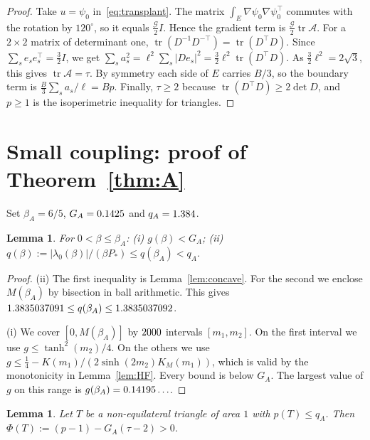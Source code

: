 \documentclass[11pt]{article}
\newtheorem{lemma}[theorem]{Lemma}
\theoremstyle{remark}
\newcommand{\E}{E}
\DeclareMathOperator{\tr}{tr}
\begin{document}
\begin{proof}
Take $u=\psi_0$ in~\eqref{eq:transplant}. The matrix $\int_\E\nabla\psi_0\nabla\psi_0^{\top}$ commutes with the
rotation by $120^\circ$, so it equals $\frac{\mathcal G}2I$. Hence the gradient term is
$\frac{\mathcal G}2\tr\mathcal A$. For a $2\times2$ matrix of determinant one,
$\tr(D^{-1}D^{-\top})=\tr(D^\top D)$. Since $\sum_se_se_s^\top=\frac32I$, we get
$\sum_s a_s^2=\ell^2\sum_s|De_s|^2=\frac32\ell^2\tr(D^\top D)$. As $\frac32\ell^2=2\sqrt3$, this gives
$\tr\mathcal A=\tau$. By symmetry each side of $\E$ carries $B/3$, so the boundary term is
$\frac B3\sum_s a_s/\ell=Bp$. Finally, $\tau\ge2$ because $\tr(D^\top D)\ge2\det D$, and $p\ge1$ is the
isoperimetric inequality for triangles.
\end{proof}

\section{Small coupling: proof of Theorem~\ref{thm:A}}\label{sec:A}

Set $\beta_A=6/5$, $G_A=0.1425$ and $q_A=1.384$.

\begin{lemma}\label{lem:gq}
For $0<\beta\le\beta_A$: (i) $g(\beta)<G_A$; (ii)
$q(\beta):=|\lambda_0(\beta)|/(\beta P_*)\le q(\beta_A)<q_A$.
\end{lemma}

\begin{proof}
(ii) The first inequality is Lemma~\ref{lem:concave}. For the second we enclose $M(\beta_A)$ by
bisection in ball arithmetic. This gives $1.3835037091\le q(\beta_A)\le1.3835037092$.

(i) We cover $[0,M(\beta_A)]$ by $2000$ intervals $[m_1,m_2]$. On the first interval we use
$g\le\tanh^2(m_2)/4$. On the others we use $g\le\frac14-K(m_1)/(2\sinh(2m_2)K_M(m_1))$, which is valid by
the monotonicity in Lemma~\ref{lem:HF}. Every bound is below $G_A$. The largest value of $g$ on this
range is $g(\beta_A)=0.14195\ldots$.
\end{proof}

\begin{lemma}\label{lem:geomA}
Let $T$ be a non-equilateral triangle of area $1$ with $p(T)\le q_A$. Then
$\Phi(T):=(p-1)-G_A(\tau-2)>0$.
\end{lemma}
\end{document}
